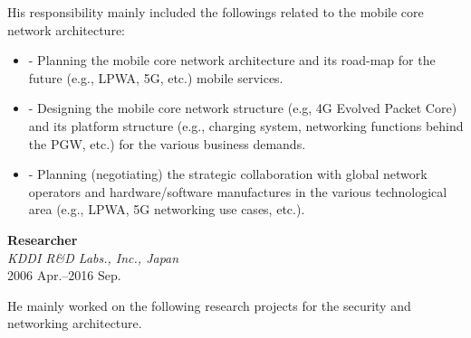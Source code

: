 \hspace*{4ex} His responsibility mainly included the followings related to the mobile core network architecture:
\begin{itemize}
 \item \hspace*{4ex}\begin{minipage}{0.9\linewidth}
- Planning the mobile core network architecture and its road-map for the future (e.g., LPWA, 5G, etc.) mobile services.\end{minipage}
 \item \hspace*{4ex}\begin{minipage}{0.9\linewidth}
- Designing the mobile core network structure (e.g, 4G Evolved Packet Core) and its platform structure (e.g., charging system, networking functions behind the PGW, etc.) for the various business demands.
\end{minipage}
 \item \hspace*{4ex}\begin{minipage}{0.9\linewidth}
- Planning (negotiating) the strategic collaboration with global network operators and hardware/software manufactures in the various technological area (e.g., LPWA, 5G networking use cases, etc.).
\end{minipage}
\end{itemize}
\vspace*{2ex}


\textbf{Researcher}\\
\hspace*{4ex}\textit{KDDI R\&D Labs.\@, Inc., Japan}\\
\hspace*{4ex}2006 Apr.--2016 Sep.

\hspace*{4ex} He mainly worked on the following research projects for the security and networking architecture.


